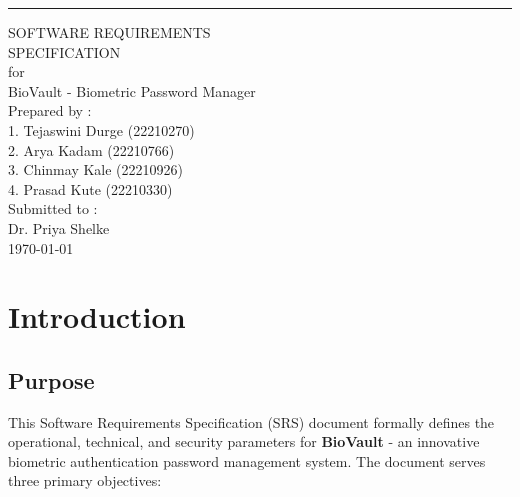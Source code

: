 \documentclass{scrreprt}
\date{}
\begin{document}
\begin{titlepage}
    \begin{flushright}
        \rule{16cm}{5pt}\vskip1cm
        \begin{bfseries}
            \Huge{SOFTWARE REQUIREMENTS\\ SPECIFICATION}\\
            \vspace{1.5cm}
            for\\
            \vspace{1.5cm}
            \Large{BioVault - Biometric Password Manager}\\
            \vspace{1.5cm}
            \Large{Prepared by :}\\
            \vspace{0.5cm}
            1. Tejaswini Durge (22210270)\\
            2. Arya Kadam (22210766)\\
            3. Chinmay Kale (22210926)\\
            4. Prasad Kute (22210330)\\
            \vspace{1.5cm}
            \Large{Submitted to :}\\
            \vspace{0.5cm}
            Dr. Priya Shelke\\
            \vspace{1.5cm}
            \Large{\today}\\
        \end{bfseries}
    \end{flushright}
\end{titlepage}

\tableofcontents
\newpage

\chapter{Introduction}
\label{chap:introduction}

\section{Purpose}
\label{sec:purpose}
This Software Requirements Specification (SRS) document formally defines the operational, technical, and security parameters for \textbf{BioVault} - an innovative biometric authentication password management system. The document serves three primary objectives:
\end{document}
